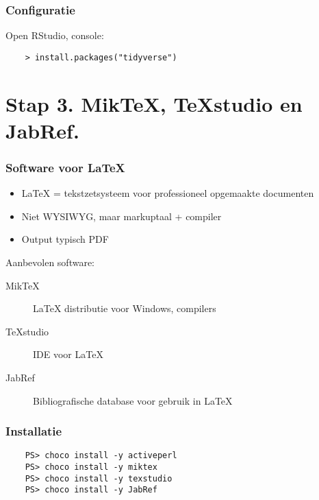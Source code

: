 \documentclass[aspectratio=169]{beamer}
\begin{document}
\begin{frame}[fragile]
  \frametitle{Configuratie}

  Open RStudio, console:

  \begin{verbatim}
    > install.packages("tidyverse")
  \end{verbatim}

\end{frame}

\section{Stap 3. MikTeX, TeXstudio en JabRef.}

\begin{frame}
  \frametitle{Software voor {\LaTeX}}

  \begin{itemize}
    \item {\LaTeX} = tekstzetsysteem voor professioneel opgemaakte documenten
    \item Niet WYSIWYG, maar markuptaal + compiler
    \item Output typisch PDF
  \end{itemize}

  \bigskip

  Aanbevolen software:

  \begin{description}
    \item[MikTeX] {\LaTeX} distributie voor Windows, compilers
    \item[TeXstudio]  IDE voor {\LaTeX}
    \item[JabRef] Bibliografische database voor gebruik in {\LaTeX}
  \end{description}

\end{frame}

\begin{frame}[fragile]
  \frametitle{Installatie}

  \begin{verbatim}
    PS> choco install -y activeperl
    PS> choco install -y miktex
    PS> choco install -y texstudio
    PS> choco install -y JabRef
  \end{verbatim}

\end{frame}
\end{document}
